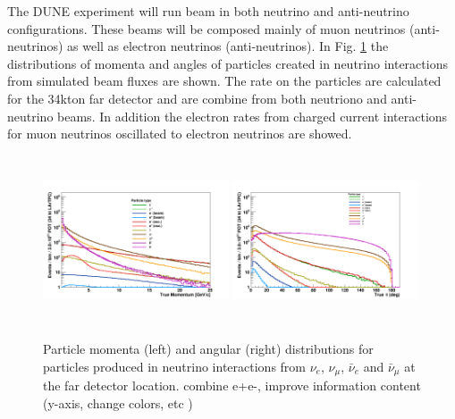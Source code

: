 The DUNE experiment will run beam in both neutrino and anti-neutrino 
configurations. These beams will be composed  mainly of muon neutrinos (anti-neutrinos) as well as electron neutrinos (anti-neutrinos). In Fig. \ref{fig:particle_momenta} the distributions of momenta and angles of particles created in neutrino interactions from simulated beam fluxes are shown. The rate on the particles are calculated for the 34kton far detector and  are combine from both neutriono and anti-neutrino beams. In addition the electron rates from charged current interactions for muon neutrinos oscillated to electron neutrinos are showed. 
\begin{figure}[h!]
  \centering
\includegraphics[width=0.49\textwidth,height=5.0cm]{figures/True_Momenta_per_Particle_9_2_1_0_log}
\includegraphics[width=0.49\textwidth,height=5.0cm]{figures/True_theta_per_Particle_9_2_1_0_lin}
\label{fig:particle_momenta}
  \caption{Particle momenta (left) and angular (right) distributions for particles produced in neutrino interactions 
from $\nu_e$, $\nu_\mu$, $\bar \nu_e$ and $\bar \nu_\mu$ at the far detector location.
{\color{red}  combine e+e-, improve information content (y-axis, change colors, etc )
}
}
\end{figure}



